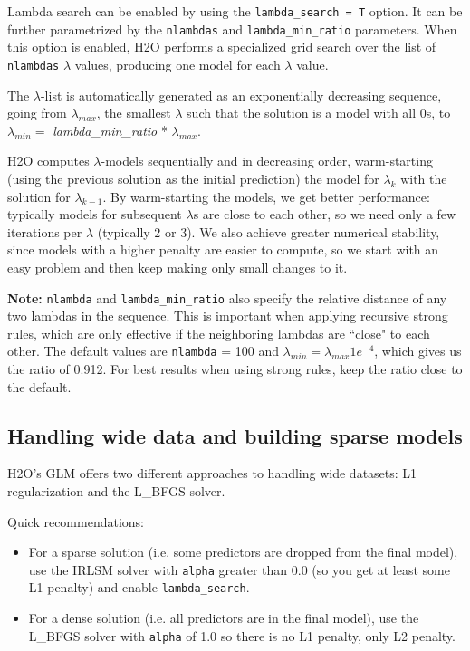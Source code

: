 Lambda search can be enabled by using the \texttt{lambda\_search = T} option. It can be further parametrized by
the \texttt{nlambdas} and \texttt{lambda\_min\_ratio} parameters. When this option is enabled, H2O performs a
specialized grid search over the list of \texttt{nlambdas} $\lambda$ values, producing one model for each $\lambda$
value.

The $\lambda$-list is automatically generated as an exponentially decreasing sequence, going from $\lambda_{max}$,
the smallest $\lambda$ such that the solution is a model with all 0s, to $\lambda_{min} =
$ \textit{lambda\_min\_ratio} * $ \lambda_{max}$.

H2O computes $\lambda$-models sequentially and in decreasing order, warm-starting (using the previous solution as
the initial prediction) the model for $\lambda_k$ with the solution for $\lambda_{k-1}$. By warm-starting the
models, we get better performance: typically models for subsequent $\lambda$s are close to each other, so we need
only a few iterations per $\lambda$ (typically 2 or 3). We also achieve greater numerical stability, since models
with a higher penalty are easier to compute, so we start with an easy problem and then keep making only small
changes to it.

\textbf{Note:} \texttt{nlambda} and \texttt{lambda\_min\_ratio} also specify the relative distance of any two
 lambdas in the sequence. This is important when applying recursive strong rules, which are only effective if the
neighboring lambdas are ``close" to each other. The default values are \texttt{nlambda} = 100 and $\lambda_{min}
= \lambda_{max} 1e^{-4}$, which gives us the ratio of 0.912.  For best results when using strong rules, keep the
ratio close to the default.

\subsection{Handling wide data and building sparse models}

H2O's GLM offers two different approaches to handling wide datasets:  L1 regularization and the L\_BFGS solver.

Quick recommendations:

\begin{itemize}
\item For a sparse solution (i.e. some predictors are dropped from the final model), use the IRLSM solver with 
      \texttt{alpha} greater than 0.0 (so you get at least some L1 penalty) and enable \texttt{lambda\_search}.

\item For a dense solution (i.e. all predictors are in the final model), use the L\_BFGS solver with
      \texttt{alpha} of 1.0 so there is no L1 penalty, only L2 penalty.
\end{itemize}

